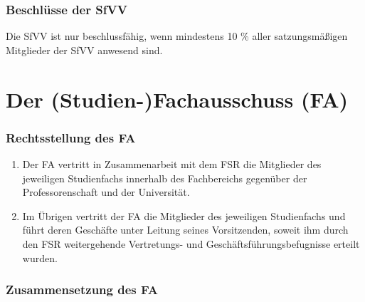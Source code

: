 \documentclass{article}
\begin{document}
\section{Beschlüsse der SfVV}\label{beschluxfcsse-der-sfvv}
Die SfVV ist nur beschlussfähig, wenn mindestens 10 \% aller satzungsmäßigen Mitglieder der SfVV anwesend sind.

\part{Der (Studien-)Fachausschuss (FA)}
\section{Rechtsstellung des FA}

\begin{enumerate}[(1)]
	\item Der FA vertritt in Zusammenarbeit mit dem FSR die Mitglieder des jeweiligen Studienfachs innerhalb des Fachbereichs gegenüber der Professorenschaft und der Universität.
	\item Im Übrigen vertritt der FA die Mitglieder des jeweiligen Studienfachs und führt deren Geschäfte unter Leitung seines Vorsitzenden, soweit ihm durch den FSR weitergehende Vertretungs- und Geschäftsführungsbefugnisse erteilt wurden.
\end{enumerate}

\section{Zusammensetzung des FA}
\end{document}
